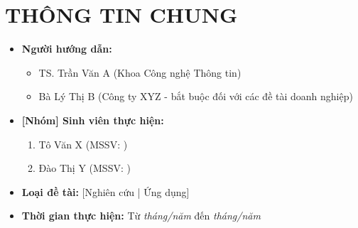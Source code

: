 \documentclass{article}[14pt]
\begin{document}
    \section{THÔNG TIN CHUNG}
    \begin{itemize}[label = {}]
        
        \item \textbf{Người hướng dẫn:} 
        \begin{itemize}
            \item TS. Trần Văn A (Khoa Công nghệ Thông tin)
            \item Bà Lý Thị B (Công ty XYZ - bắt buộc đối với các đề tài doanh nghiệp)
        \end{itemize}{}
    
        
        \item \textbf{[Nhóm] Sinh viên thực hiện:}
        
        \begin{enumerate}
        
            \item Tô Văn X (MSSV: ) 
            \item Đào Thị Y (MSSV: )
        \end{enumerate}

        \item \textbf{Loại đề tài:} [Nghiên cứu | Ứng dụng]
        
        \item \textbf{Thời gian thực hiện:} Từ \textit{tháng/năm} đến \textit{tháng/năm}
        
        
    \end{itemize}
    
    \pagebreak 
    
\end{document}

